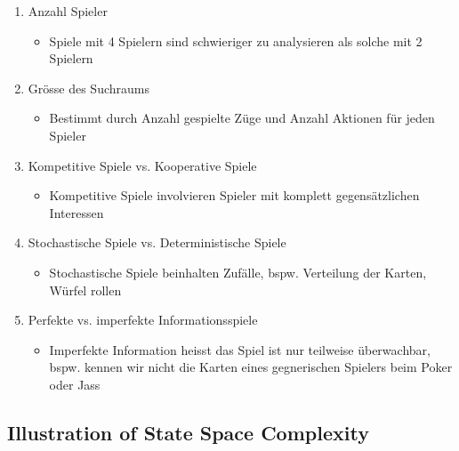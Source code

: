 \documentclass[a4paper]{article}
\begin{document}
		\begin{enumerate}
			\item Anzahl Spieler
			\begin{itemize}
				\item Spiele mit 4 Spielern sind schwieriger zu analysieren als solche mit 2 Spielern
			\end{itemize}
			\item Grösse des Suchraums
			\begin{itemize}
				\item Bestimmt durch Anzahl gespielte Züge und Anzahl Aktionen für jeden Spieler
			\end{itemize}
			\item Kompetitive Spiele vs. Kooperative Spiele
			\begin{itemize}
				\item Kompetitive Spiele involvieren Spieler mit komplett gegensätzlichen Interessen 
			\end{itemize}
			\item Stochastische Spiele vs. Deterministische Spiele
			\begin{itemize}
				\item Stochastische Spiele beinhalten Zufälle, bspw. Verteilung der Karten, Würfel rollen
			\end{itemize}
			\item Perfekte vs. imperfekte Informationsspiele
			\begin{itemize}
				\item Imperfekte Information heisst das Spiel ist nur teilweise überwachbar, bspw. kennen wir nicht die Karten eines gegnerischen Spielers beim Poker oder Jass
			\end{itemize}
		\end{enumerate}
	
		\subsection{Illustration of State Space Complexity}
		
\end{document}
